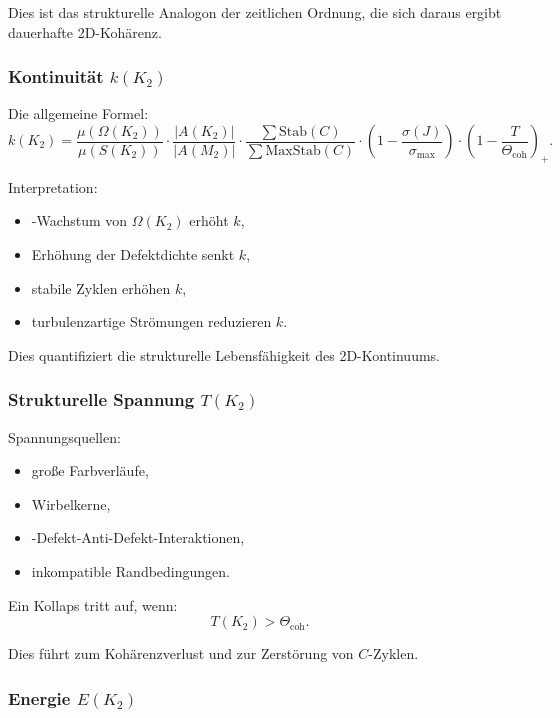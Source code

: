 Dies ist das strukturelle Analogon der zeitlichen Ordnung, die sich daraus ergibt
dauerhafte 2D-Kohärenz.

\subsubsection{Kontinuität \texorpdfstring{$k(K_2)$}{k(K_2)}}

Die allgemeine Formel:
\[
k(K_2) =
\frac{\mu(\Omega(K_2))}{\mu(S(K_2))}
\cdot
\frac{|A(K_2)|}{|A(M_2)|}
\cdot
\frac{\sum \mathrm{Stab}(C)}{\sum \mathrm{MaxStab}(C)}
\cdot
\left(1 - \frac{\sigma(J)}{\sigma_{\max}}\right)
\cdot
\left(1 - \frac{T}{\Theta_{\mathrm{coh}}}\right)_+.
\]

Interpretation:
\begin{itemize}
    Das \item-Wachstum von $\Omega(K_2)$ erhöht $k$,
    \item Erhöhung der Defektdichte senkt $k$,
    \item stabile Zyklen erhöhen $k$,
    \item turbulenzartige Strömungen reduzieren $k$.
\end{itemize}

Dies quantifiziert die strukturelle Lebensfähigkeit des 2D-Kontinuums.

\subsubsection{Strukturelle Spannung \texorpdfstring{$T(K_2)$}{T(K_2)}}

Spannungsquellen:
\begin{itemize}
    \item große Farbverläufe,
    \item Wirbelkerne,
    \item-Defekt-Anti-Defekt-Interaktionen,
    \item inkompatible Randbedingungen.
\end{itemize}

Ein Kollaps tritt auf, wenn:
\[
T(K_2) > \Theta_{\mathrm{coh}}.
\]

Dies führt zum Kohärenzverlust und zur Zerstörung von $C$-Zyklen.

\subsubsection{Energie \texorpdfstring{$E(K_2)$}{E(K_2)}}

